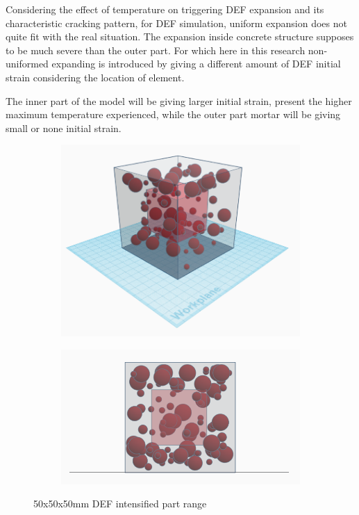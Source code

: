 Considering the effect of temperature on triggering  DEF expansion and its characteristic cracking pattern, for DEF simulation, uniform expansion does not quite fit with the real situation. The expansion inside concrete structure supposes to be much severe than the outer part. For which here in this research non-uniformed expanding is introduced by giving a different amount of DEF initial strain considering the location of element.


The inner part of the model will be giving larger initial strain,  present the higher maximum temperature experienced, while the outer part mortar will be giving small or none initial strain.

\begin{figure}[ht]
\centering
    \begin{subfigure}{.33\textwidth}
      \centering
      \includegraphics[width=.8\linewidth]{Files/DEF_X/X0_3d.png}
    \end{subfigure}%
    \begin{subfigure}{.33\textwidth}
      \centering
      \includegraphics[width=.8\linewidth]{Files/DEF_X/X0_3ds.png}
    \end{subfigure}
  \caption{50x50x50mm DEF intensified part range}
  \label{fig:non-uniform DEF}
  \end{figure}


